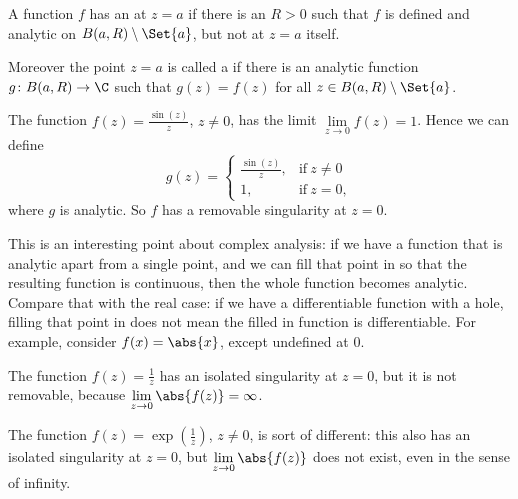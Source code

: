 


\begin{definition}[Singularity]
	A function $f$ has an  at $z = a$ if there is an $R > 0$ such that $f$ is defined and analytic on $B(a, R) \setminus \Set{a}$, but not at $z = a$ itself.

	Moreover the point $z = a$ is called a  if there is an analytic function $g \colon B(a, R) \to \C$ such that $g(z) = f(z)$ for all $z \in B(a, R) \setminus \Set{a}$.
\end{definition}

\begin{example}
	The function $f(z) = \frac{\sin(z)}{z}$, $z \neq 0$, has the limit $\lim\limits_{z \to 0} f(z) = 1$.
	Hence we can define
	\[
		g(z) = \begin{cases}
			\frac{\sin(z)}{z}, & \text{if}~ z \neq 0 \\
			1, & \text{if}~ z = 0,
		\end{cases}
	\]
	where $g$ is analytic.
	So $f$ has a removable singularity at $z = 0$.
\end{example}

This is an interesting point about complex analysis: if we have a function that is analytic apart from a single point, and we can fill that point in so that the resulting function is continuous, then the whole function becomes analytic.
Compare that with the real case: if we have a differentiable function with a hole, filling that point in does not mean the filled in function is differentiable.
For example, consider $f(x) = \abs{x}$, except undefined at $0$.

\begin{example}
	The function $f(z) = \frac{1}{z}$ has an isolated singularity at $z = 0$, but it is not removable, because $\lim\limits_{z \to 0} \abs{f(z)} = \infty$.
\end{example}

\begin{example}
	The function $f(z) = \exp(\frac{1}{z})$, $z \neq 0$, is sort of different: this also has an isolated singularity at $z = 0$, but $\lim\limits_{z \to 0} \abs{f(z)}$ does not exist, even in the sense of infinity.
\end{example}

